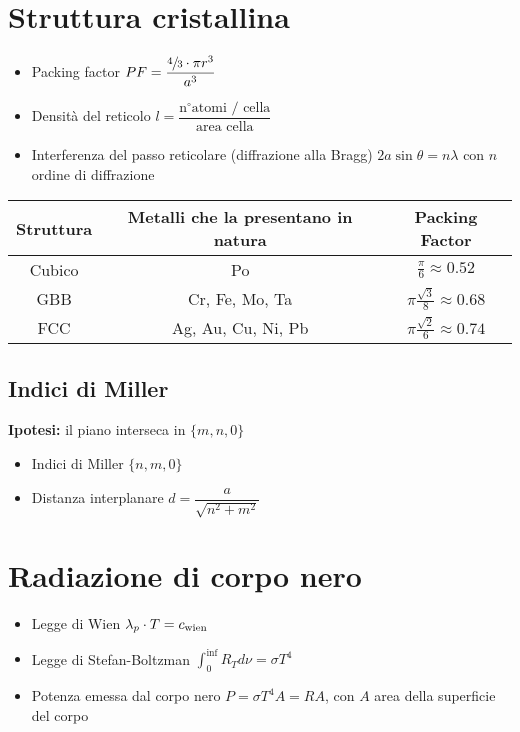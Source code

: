 \documentclass{article}
\begin{document}
\section{Struttura cristallina}
\begin{itemize}
  \item Packing factor \( PF = \dfrac{ \sfrac{4}{3} \cdot \pi r^3}{a^3} \)
  \item Densità del reticolo \( l = \dfrac{\text{n} ^ \circ \text{atomi / cella}}{\text{area cella}} \)
  \item Interferenza del passo reticolare (diffrazione alla Bragg) \(  2a \sin \theta = n \lambda \) con \( n \) ordine di diffrazione
\end{itemize}

\vspace{1cm}
\renewcommand{\arraystretch}{2}
\begin{center}
  \begin{tabular}{|c|c|c|}
    \hline
    \textbf{Struttura} & \textbf{Metalli che la presentano in natura} & \textbf{Packing Factor}                  \\
    \hline
    Cubico             & Po                                           & \(\frac{\pi}{6} \approx 0.52 \)          \\
    \hline
    GBB                & Cr, Fe, Mo, Ta                               & \(\pi \frac{\sqrt{3}}{8} \approx 0.68 \) \\
    \hline
    FCC                & Ag, Au, Cu, Ni, Pb                           & \(\pi \frac{\sqrt{2}}{6} \approx 0.74 \) \\
    \hline
  \end{tabular}
\end{center}
\renewcommand{\arraystretch}{1}
\vspace{1cm}

\subsection{Indici di Miller}
\textbf{Ipotesi:} il piano interseca in \( \{m, n, 0\} \)
\begin{itemize}
  \item Indici di Miller \( \{n, m, 0\} \)
  \item Distanza interplanare \( d = \dfrac{a}{\sqrt{n^2+m^2}} \)
\end{itemize}

\section{Radiazione di corpo nero}
\begin{itemize}
  \item Legge di Wien \( \lambda_{p} \cdot T = c_{\textnormal{wien}} \)
  \item Legge di Stefan-Boltzman \( \displaystyle \int_{0}^{\inf} R_T d \nu = \sigma T ^ 4 \)
  \item Potenza emessa dal corpo nero \( P = \sigma T^4 A = R A \), con \(A\) area della superficie del corpo
\end{itemize}
\end{document}
